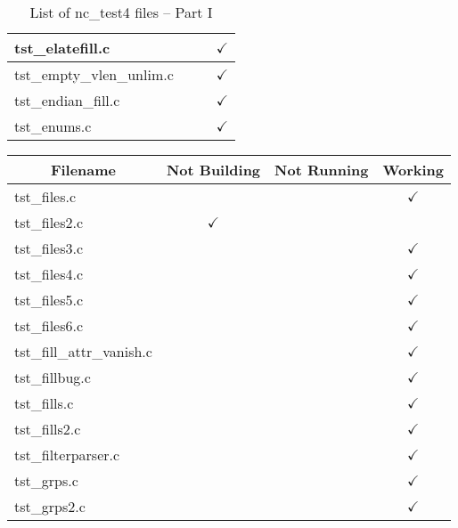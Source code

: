 \begin{table}[H]
\begin{tabular}{|l|c|c|c|}
tst\_elatefill.c        &               &               & $\checkmark$    \\ \hline
tst\_empty\_vlen\_unlim.c  &            &               & $\checkmark$    \\ \hline
tst\_endian\_fill.c     &               &               & $\checkmark$    \\ \hline
tst\_enums.c            &               &               & $\checkmark$    \\ \hline
\hline
\end{tabular}
\caption{\label{tab:nc_test4_1} List of nc\_test4 files -- Part I}
\end{table}

\begin{table}[H]
\centering
\begin{tabular}{|l|c|c|c|}
\hline
\multicolumn{1}{|c|}{\parbox{6cm}{\centering Filename}} & \multicolumn{1}{c|}{Not Building} & \multicolumn{1}{c|}{Not Running} & \multicolumn{1}{c|}{Working} \\ \hline \hline
tst\_files.c            &               &               & $\checkmark$    \\ \hline
tst\_files2.c           & $\checkmark$  &               &                 \\ \hline
tst\_files3.c           &               &               & $\checkmark$    \\ \hline
tst\_files4.c           &               &               & $\checkmark$    \\ \hline
tst\_files5.c           &               &               & $\checkmark$    \\ \hline
tst\_files6.c           &               &               & $\checkmark$    \\ \hline
tst\_fill\_attr\_vanish.c  &            &               & $\checkmark$    \\ \hline
tst\_fillbug.c          &               &               & $\checkmark$    \\ \hline
tst\_fills.c            &               &               & $\checkmark$    \\ \hline
tst\_fills2.c           &               &               & $\checkmark$    \\ \hline
tst\_filterparser.c     &               &               & $\checkmark$    \\ \hline
tst\_grps.c             &               &               & $\checkmark$    \\ \hline
tst\_grps2.c            &               &               & $\checkmark$    \\ \hline

\end{tabular}
\end{table}
